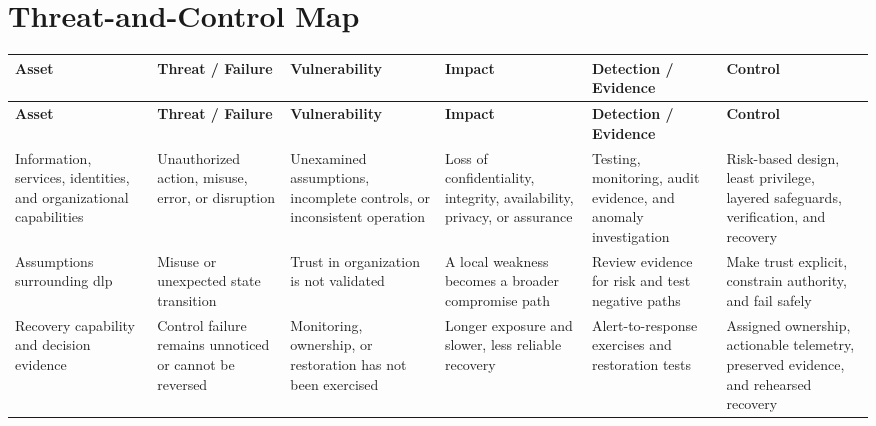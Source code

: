 \documentclass[11pt,letterpaper]{article}
\begin{document}
\section*{Threat-and-Control Map}
\begingroup\scriptsize\setlength{\tabcolsep}{2pt}
\begin{longtable}{>{\raggedright\arraybackslash}p{}>{\raggedright\arraybackslash}p{}>{\raggedright\arraybackslash}p{}>{\raggedright\arraybackslash}p{}>{\raggedright\arraybackslash}p{}>{\raggedright\arraybackslash}p{}}
\toprule\rowcolor{Navy}\color{white}\textbf{Asset} & \color{white}\textbf{Threat / Failure} & \color{white}\textbf{Vulnerability} & \color{white}\textbf{Impact} & \color{white}\textbf{Detection / Evidence} & \color{white}\textbf{Control}\\\midrule
\endfirsthead
\toprule\rowcolor{Navy}\color{white}\textbf{Asset} & \color{white}\textbf{Threat / Failure} & \color{white}\textbf{Vulnerability} & \color{white}\textbf{Impact} & \color{white}\textbf{Detection / Evidence} & \color{white}\textbf{Control}\\\midrule
\endhead
Information, services, identities, and organizational capabilities & Unauthorized action, misuse, error, or disruption & Unexamined assumptions, incomplete controls, or inconsistent operation & Loss of confidentiality, integrity, availability, privacy, or assurance & Testing, monitoring, audit evidence, and anomaly investigation & Risk-based design, least privilege, layered safeguards, verification, and recovery\\\midrule
Assumptions surrounding dlp & Misuse or unexpected state transition & Trust in organization is not validated & A local weakness becomes a broader compromise path & Review evidence for risk and test negative paths & Make trust explicit, constrain authority, and fail safely\\\midrule
Recovery capability and decision evidence & Control failure remains unnoticed or cannot be reversed & Monitoring, ownership, or restoration has not been exercised & Longer exposure and slower, less reliable recovery & Alert-to-response exercises and restoration tests & Assigned ownership, actionable telemetry, preserved evidence, and rehearsed recovery\\\midrule
\bottomrule
\end{longtable}
\endgroup
\end{document}
